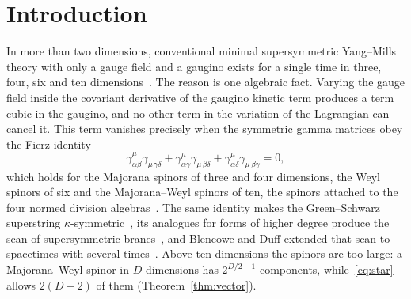 \section{Introduction}
\label{sec:intro}

In more than two dimensions, conventional minimal supersymmetric Yang--Mills theory with only a gauge field and a gaugino exists for a single time in three, four, six and ten dimensions~\cite{BrinkSchwarzScherk1977,KugoTownsend1983,Evans1988,BaezHuerta2010}. The reason is one algebraic fact. Varying the gauge field inside the covariant derivative of the gaugino kinetic term produces a term cubic in the gaugino, and no other term in the variation of the Lagrangian can cancel it. This term vanishes precisely when the symmetric gamma matrices obey the Fierz identity
\begin{equation}
\label{eq:star}
\gamma^{\mu}_{\alpha\beta}\gamma_{\mu\,\gamma\delta}+\gamma^{\mu}_{\alpha\gamma}\gamma_{\mu\,\beta\delta}+\gamma^{\mu}_{\alpha\delta}\gamma_{\mu\,\beta\gamma}=0 ,
\end{equation}
which holds for the Majorana spinors of three and four dimensions, the Weyl spinors of six and the Majorana--Weyl spinors of ten, the spinors attached to the four normed division algebras~\cite{KugoTownsend1983,Evans1988,BaezHuerta2010}. The same identity makes the Green--Schwarz superstring $\kappa$-symmetric~\cite{GreenSchwarz1984}, its analogues for forms of higher degree produce the scan of supersymmetric branes~\cite{AchucarroEvansTownsendWiltshire1987,BergshoeffSezginTownsend1987}, and Blencowe and Duff extended that scan to spacetimes with several times~\cite{BlencoweDuff1988}. Above ten dimensions the spinors are too large: a Majorana--Weyl spinor in $D$ dimensions has $2^{D/2-1}$ components, while~\eqref{eq:star} allows $2(D-2)$ of them (Theorem~\ref{thm:vector}).

